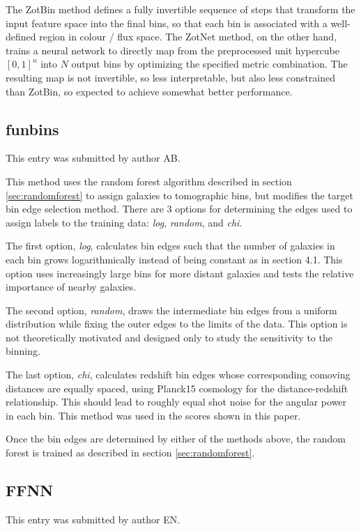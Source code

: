 \documentclass[twocolumn,twocolappendix]{aastex63}
\begin{document}
The ZotBin method defines a fully invertible sequence of steps that transform the input feature space into
the final bins, so that each bin is associated with a well-defined region in colour / flux space. The ZotNet method,
on the other hand, trains a neural network to directly map from the preprocessed unit hypercube $[0,1]^n$ into
$N$ output bins by optimizing the specified metric combination. The resulting map is not invertible, so less
interpretable, but also less constrained than ZotBin, so expected to achieve somewhat better performance.

\subsection{ {\sc funbins} } \label{sec:funbins}
This entry was submitted by author AB.

This method uses the random forest algorithm described in section \ref{sec:randomforest} to assign galaxies to tomographic bins, but modifies the target bin edge selection method. There are 3 options for determining the edges used to assign labels to the training data: \textit{log}, \textit{random}, and \textit{chi}. 

The first option, \textit{log}, calculates bin edges such that the number of galaxies in each bin grows logarithmically instead of being constant as in section 4.1. This option uses increasingly large bins for more distant galaxies and tests the relative importance of nearby galaxies.

The second option, \textit{random}, draws the intermediate bin edges from a uniform distribution while fixing the outer edges to the limits of the data. This option is not theoretically motivated and designed only to study the sensitivity to the binning. 

The last option, \textit{chi}, calculates redshift bin edges whose corresponding comoving distances are equally spaced, using Planck15 \citep{Planck15} cosmology for the distance-redshift relationship. This should lead to roughly equal shot noise for the angular power in each bin. 
This method was used in the scores shown in this paper.

Once the bin edges are determined by either of the methods above, the random forest is trained as described in section \ref{sec:randomforest}.

\subsection{FFNN}
This entry was submitted by author EN.
\end{document}
